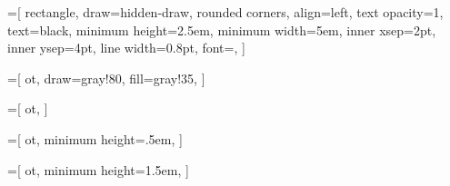 
=[
    rectangle,
    draw=hidden-draw,
    rounded corners,
    align=left,
    text opacity=1,
    text=black,
    minimum height=2.5em,
    minimum width=5em,
    inner xsep=2pt,
    inner ysep=4pt,
    line width=0.8pt,
    font=\normalsize,
]

=[
    ot,
    draw=gray!80, 
    fill=gray!35,  
]

=[
    ot, 
]

=[
    ot,
    minimum height=.5em,
]

=[
    ot, 
    minimum height=1.5em,
]
